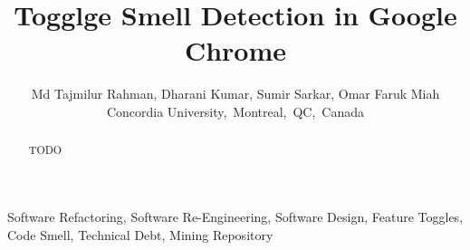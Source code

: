 \documentclass[conference]{IEEEtran}
\begin{document}
\title{Togglge Smell Detection in Google Chrome}
\author{
Md Tajmilur Rahman, Dharani Kumar, Sumir Sarkar, Omar Faruk Miah\\
Concordia University,~Montreal,~QC,~Canada
}
\maketitle

\begin{abstract}
TODO
\end{abstract}

\begin{IEEEkeywords}
Software Refactoring, Software Re-Engineering, Software Design, Feature Toggles, Code Smell, Technical Debt, Mining Repository
\end{IEEEkeywords}
\end{document}
